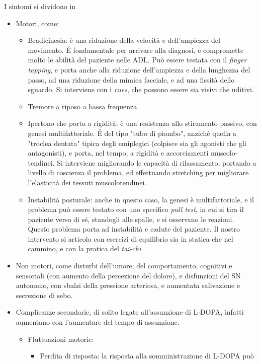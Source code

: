 I sintomi si dividono in
\begin{itemize}
\item Motori, come:
	\begin{itemize}
	\item Bradicinesia: è una riduzione della velocità e dell'ampiezza del
	movimento. \'E fondamentale per arrivare alla diagnosi, e compromette molto le
	abilità del paziente nelle ADL. Può essere testata con il
	\textit{finger tapping}, e porta anche alla riduzione dell'ampiezza e della
	lunghezza del passo, ad una riduzione della mimica facciale, e ad una fissità
	dello sguardo. Si interviene con i \textit{cues}, che possono essere sia visivi
	che uditivi.
	\item Tremore a riposo a bassa frequenza
	\item Ipertono che porta a rigidità: è una resistenza allo stiramento passivo,
	con genesi multifattoriale. \'E del tipo "tubo di piombo", anziché quella a
	"troclea dentata" tipica degli emiplegici (colpisce sia gli agonisti che gli
	antagonisti), e porta, nel tempo, a rigidità e accorciamenti muscolo-tendinei.
	Si interviene migliorando le capacità di rilassamento, portando a livello di
	coscienza il problema, ed effettuando stretching per migliorare l'elasticità
	dei tessuti muscolotendinei.
	\item Instabilità posturale: anche in questo caso, la genesi è multifattoriale,
	e il problema può essere testato con uno specifico \textit{pull test}, in cui
	si tira il paziente verso di sé, standogli alle spalle, e si osservano le
	reazioni. Questo problema porta ad instabilità e cadute del paziente.
	Il nostro intervento si articola con esercizi di equilibrio sia in statica che
	nel cammino, e con la pratica del \textit{tai-chi}.
	\end{itemize}
\item Non motori, come disturbi dell'umore, del comportamento, cognitivi e
sensoriali (con aumento della percezione del dolore), e disfunzioni del SN
autonomo, con sbalzi della pressione arteriosa, e aumentata salivazione e
secrezione di sebo.
\item Complicanze secondarie, di solito legate all'assunzione di L-DOPA, infatti
aumentano con l'aumentare del tempo di assunzione.
	\begin{itemize}
	\item Fluttuazioni motorie:
		\begin{itemize}
		\item Perdita di risposta: la risposta alla somministrazione di L-DOPA può

\end{itemize}
\end{itemize}
\end{itemize}
